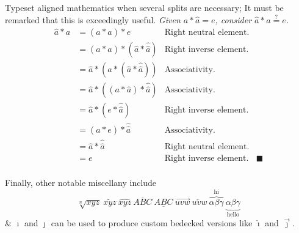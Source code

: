 Typeset aligned mathematics when several splits are necessary;
It must be remarked that this is exceedingly useful.
\def\QED{\blacksquare}%
\textit{Given $a*\widehat{a} = e$, consider $\widehat{a}*a \stackrel?= e$.}
\begin{align*}
	\widehat{a}*a
	&= (\widehat{a}*a)*e &\text{Right neutral element.} \\
	&=(\widehat{a}*a)*(\widehat{a}*\widehat{\widehat{a}}) &\text{Right inverse element.} \\
	&= \widehat{a}*(a*(\widehat{a}*\widehat{\widehat{a}})) &\text{Associativity.} \\
	&= \widehat{a}*((a*\widehat{a})*\widehat{\widehat{a}}) &\text{Associativity.} \\
	&= \widehat{a}*(e*\widehat{\widehat{a}}) &\text{Right inverse element.} \\
	&= (\widehat{a}*e)*\widehat{\widehat{a}} &\text{Associativity.} \\
	&= \widehat{a}*\widehat{\widehat{a}} &\text{Right neutral element.} \\
	&= e &\text{Right inverse element.}  &\QED \\
\end{align*}

Finally, other notable miscellany include
$$
\sqrt[n]{xyz}\ \widetilde{xyz}\ \widehat{xyz}\ \overline{ABC}\ \underline{ABC}\ \overrightarrow{uvw}\ \overleftarrow{uvw}\ \overbrace{\alpha\beta\gamma}^{\text{hi}}\ \underbrace{\alpha\beta\gamma}_{\text{hello}}
$$
\& $\imath$ and $\jmath$ can be used to produce custom bedecked versions like $\hat\imath$ and $\vec\jmath$.

\bigskip
{}